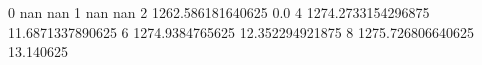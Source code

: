 0 nan nan
1 nan nan
2 1262.586181640625 0.0
4 1274.2733154296875 11.6871337890625
6 1274.9384765625 12.352294921875
8 1275.726806640625 13.140625
